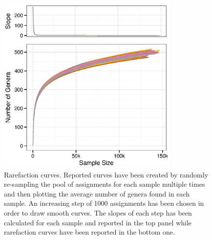 \begin{figure}[!tb]
	\centering
	\includegraphics[width=0.8\textwidth]{./figures/Chapter_3/Fig2.eps}
  	\caption{Rarefaction curves. Reported curves have been created by randomly re-sampling the pool of assignments for each sample multiple times and then plotting the average number of genera found in each sample. An increasing step of 1000 assignments has been chosen in order to draw smooth curves. The slopes of each step has been calculated for each sample and reported in the top panel while rarefaction curves have been reported in the bottom one. \label{fig:2rom}}
\end{figure}

